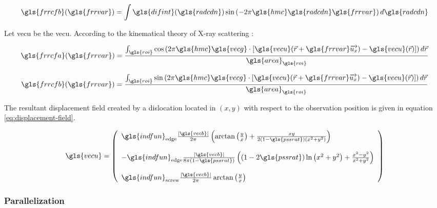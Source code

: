\begin{equation}\label{eq:fourier-b}
\gls{frrcfb}(\gls{frrvar}) = \int \gls{difint}(\gls{radcdn}) \sin \left( -2 \pi \gls{hmc} \gls{radcdn} \gls{frrvar} \right) d\gls{radcdn}
\end{equation}

Let \gls{vecu} be the \glsdesc{vecu}.
According to the kinematical theory of X-ray scattering \cite{W1990}:

\begin{equation}\label{eq:fourier-a-warren}
\gls{frrcfa}(\gls{frrvar}) = \frac{\int_{\gls{roi}} \cos \left( 2 \pi \gls{hmc} \gls{vecg} \cdot \left[ \gls{vecu}(\vec{r} + \gls{frrvar} \overrightarrow{u_x}) - \gls{vecu}(\vec{r}) \right] \right) d\vec{r}}{\gls{area}_{\gls{roi}}}
\end{equation}

\begin{equation}\label{eq:fourier-b-warren}
\gls{frrcfb}(\gls{frrvar}) = \frac{\int_{\gls{roi}} \sin \left( 2 \pi \gls{hmc} \gls{vecg} \cdot \left[ \gls{vecu}(\vec{r} + \gls{frrvar} \overrightarrow{u_x}) - \gls{vecu}(\vec{r}) \right] \right) d\vec{r}}{\gls{area}_{\gls{roi}}}
\end{equation}

\medskip

The resultant displacement field created by a dislocation located in \( ( x, y ) \) with respect to the observation position is given in equation \eqref{eq:displacement-field}.

\begin{align}\label{eq:displacement-field}
\gls{vecu} =
  \left( \begin{array}{l}
    \gls{indfun}_{\mathrm{edge}} \frac{| \gls{vecb} |}{2 \pi} \left( \arctan \left( \frac{y}{x} \right) + \frac{x y}{2 (1 - \gls{pssrat}) \left( x^2 + y^2 \right)} \right)
    \\[5mm]
    - \gls{indfun}_{\mathrm{edge}} \frac{| \gls{vecb} |}{8 \pi (1 - \gls{pssrat})} \left( (1 - 2 \gls{pssrat}) \ln \left( x^2 + y^2 \right) + \frac{x^2 - y^2}{x^2 + y^2} \right)
    \\[5mm]
    \gls{indfun}_{\mathrm{screw}} \frac{| \gls{vecb} |}{2 \pi} \arctan \left( \frac{y}{x} \right)
  \end{array} \right)
\end{align}

\subsubsection{Parallelization}

